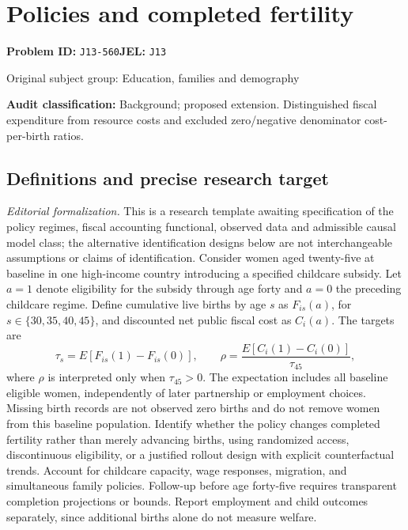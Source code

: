 \documentclass[11pt,a4paper]{article}
\begin{document}
\section*{Policies and completed fertility}
\textbf{Problem ID:} \texttt{J13-560}\quad \textbf{JEL:} \texttt{J13}\par
\label{problem:OP-0456}
{\sffamily\small\color{muted}Original subject group: Education, families and demography\par}
\label{definitions:problem:30007738}
\textbf{Audit classification:} Background; proposed extension. Distinguished fiscal expenditure from resource costs and excluded zero/negative denominator cost-per-birth ratios.
\subsection*{Definitions and precise research target}
\textit{Editorial formalization.} This is a research template awaiting specification of the policy regimes, fiscal accounting functional, observed data and admissible causal model class; the alternative identification designs below are not interchangeable assumptions or claims of identification. Consider women aged twenty-five at baseline in one high-income country introducing a specified childcare subsidy. Let \(a=1\) denote eligibility for the subsidy through age forty and \(a=0\) the preceding childcare regime. Define cumulative live births by age \(s\) as \(F_{is}(a)\), for \(s\in\{30,35,40,45\}\), and discounted net public fiscal cost as \(C_i(a)\). The targets are
\[\tau_s=E[F_{is}(1)-F_{is}(0)],\qquad\rho=\frac{E[C_i(1)-C_i(0)]}{\tau_{45}},\]
where \(\rho\) is interpreted only when \(\tau_{45}>0\). The expectation includes all baseline eligible women, independently of later partnership or employment choices. Missing birth records are not observed zero births and do not remove women from this baseline population. Identify whether the policy changes completed fertility rather than merely advancing births, using randomized access, discontinuous eligibility, or a justified rollout design with explicit counterfactual trends. Account for childcare capacity, wage responses, migration, and simultaneous family policies. Follow-up before age forty-five requires transparent completion projections or bounds. Report employment and child outcomes separately, since additional births alone do not measure welfare.
\end{document}
